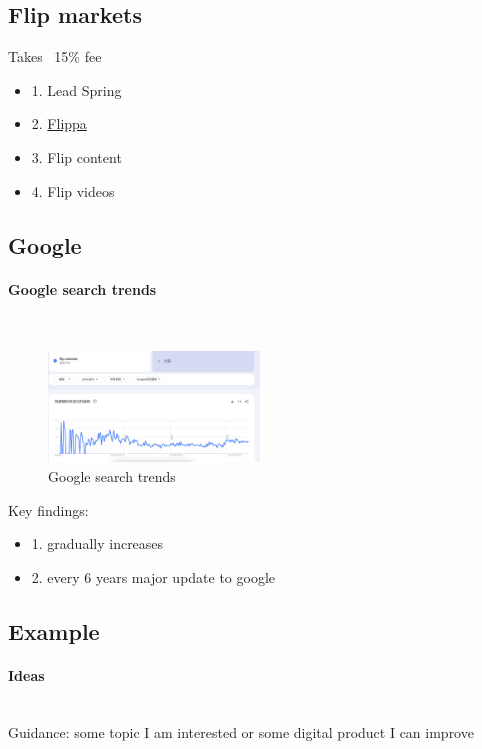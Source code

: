 \documentclass[12pt]{article}
\begin{document}
\subsection{Flip markets}

Takes ~15\% fee
\begin{itemize}
    \item 1. Lead Spring
    \item 2. \href{https://flippa.com/}{Flippa}
    \item 3. Flip content
    \item 4. Flip videos
\end{itemize}

\subsection{Google}
\paragraph{Google search trends}~\\

\begin{figure}
    \includegraphics[width=0.5\textwidth]{./images/trend_flip_websites.png}
    \caption{Google search trends}
\end{figure}

Key findings:
\begin{itemize}
    \item 1. gradually increases
    \item 2. every 6 years major update to google
\end{itemize}

\subsection{Example}
\paragraph{Ideas}~\\

Guidance: some topic I am interested or some digital product I can improve
\end{document}
